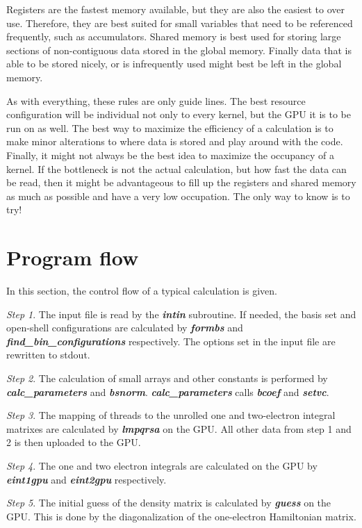 \documentclass[12pt]{report}
\begin{document}
Registers are the fastest memory available, but they are also the easiest to over use. Therefore, they are best suited for small variables that need to be referenced frequently, such as accumulators. Shared memory is best used for storing large sections of non-contiguous data stored in the global memory. Finally data that is able to be stored nicely, or is infrequently used might best be left in the global memory.

As with everything, these rules are only guide lines. The best resource configuration will be individual not only to every kernel, but the GPU it is to be run on as well. The best way to maximize the efficiency of a calculation is to make minor alterations to where data is stored and play around with the code. Finally, it might not always be the best idea to maximize the occupancy of a kernel. If the bottleneck is not the actual calculation, but how fast the data can be read, then it might be advantageous to fill up the registers and shared memory as much as possible and have a very low occupation. The only way to know is to try!

\section{Program flow}
In this section, the control flow of a typical calculation is given.

\textit{Step 1}. The input file is read by the \textit{\textbf{intin}} subroutine. If needed, the basis set and open-shell configurations are calculated by \textit{\textbf{formbs}} and \textit{\textbf{find\_bin\_configurations}} respectively. The options set in the input file are rewritten to stdout.

\textit{Step 2}. The calculation of small arrays and other constants is performed by \textit{\textbf{calc\_parameters}} and \textit{\textbf{bsnorm}}. \textit{\textbf{calc\_parameters}} calls \textit{\textbf{bcoef}} and \textit{\textbf{setvc}}.

\textit{Step 3}. The mapping of threads to the unrolled one and two-electron integral matrixes are calculated by \textit{\textbf{lmpqrsa}} on the GPU. All other data from step 1 and 2 is then uploaded to the GPU.

\textit{Step 4}. The one and two electron integrals are calculated on the GPU by \textit{\textbf{eint1gpu}} and \textit{\textbf{eint2gpu}} respectively.

\textit{Step 5}. The initial guess of the density matrix is calculated by \textit{\textbf{guess}} on the GPU. This is done by the diagonalization of the one-electron Hamiltonian matrix.
\end{document}
